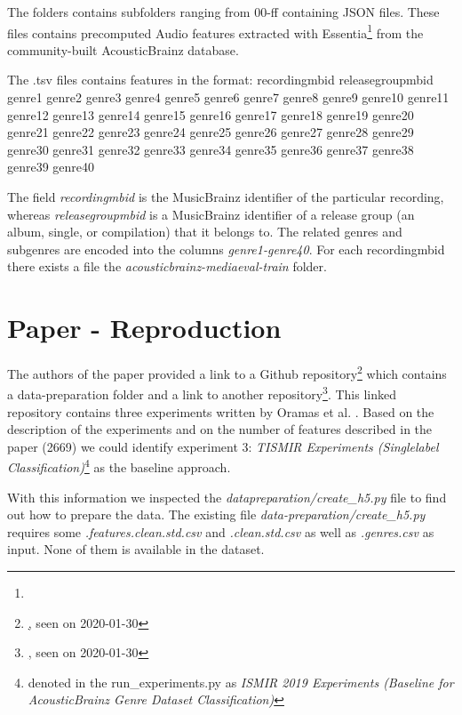 \documentclass[sigconf,nonacm]{acmart}
\begin{document}
The folders contains subfolders ranging from 00-ff containing JSON files. These files contains precomputed Audio features extracted with Essentia\footnote{} from the community-built AcousticBrainz database.

The .tsv files contains features in the format:
recordingmbid   releasegroupmbid        genre1  genre2  genre3  genre4  genre5  genre6  genre7  genre8  genre9   genre10 genre11 genre12 genre13 genre14 genre15 genre16 genre17 genre18 genre19 genre20 genre21 genre22  genre23 genre24 genre25 genre26 genre27 genre28 genre29 genre30 genre31 genre32 genre33 genre34 genre35  genre36 genre37 genre38 genre39 genre40

The field \textit{recordingmbid} is the MusicBrainz identifier of the particular recording, whereas \textit{releasegroupmbid} is a MusicBrainz identifier of a release group (an album, single, or compilation) that it belongs to. The related genres and subgenres are encoded into the columns \textit{genre1-genre40}.
For each recordingmbid there exists a file the \textit{acousticbrainz-mediaeval-train} folder.



\section{Paper - Reproduction}

The authors of the paper provided a link to a Github repository\footnote{\href{https://github.com/MTG/acousticbrainz-mediaeval-baselines}, seen on 2020-01-30} which contains a data-preparation folder and a link to another repository\footnote{\href{https://github.com/sergiooramas/tartarus/tree/b214f66dd4e61e83edc45ffc5c280efe7318a1b6}, seen on 2020-01-30}. 
This linked repository contains three experiments written by Oramas et al. . Based on the description of the experiments and on the number of features described in the paper (2669) we could identify experiment 3: \textit{TISMIR Experiments (Single\-label Classification)}\footnote{denoted in the run\_experiments.py as \textit{ISMIR 2019 Experiments (Baseline for AcousticBrainz Genre Dataset Classification)}} as the baseline approach.

With this information we inspected the \textit{data\-preparation/create\_h5.py} file to find out how to prepare the data. The existing file \textit{data-preparation/create\_h5.py} requires some \textit{.features.clean.std.csv} and \textit{.clean.std.csv} as well as \textit{.genres.csv} as input. None of them is available in the dataset.
\end{document}
